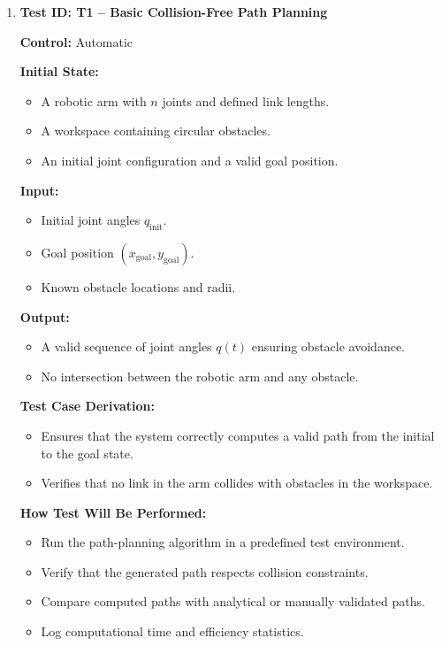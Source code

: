 \documentclass[12pt, titlepage]{article}
\begin{document}
\begin{enumerate}

\item \textbf{Test ID: T1 -- Basic Collision-Free Path Planning}  

\textbf{Control:} Automatic  

\textbf{Initial State:}  
\begin{itemize}
    \item A robotic arm with \( n \) joints and defined link lengths.
    \item A workspace containing circular obstacles.
    \item An initial joint configuration and a valid goal position.
\end{itemize}

\textbf{Input:}  
\begin{itemize}
    \item Initial joint angles \( q_{\text{init}} \).
    \item Goal position \( (x_{\text{goal}}, y_{\text{goal}}) \).
    \item Known obstacle locations and radii.
\end{itemize}

\textbf{Output:}  
\begin{itemize}
    \item A valid sequence of joint angles \( q(t) \) ensuring obstacle avoidance.
    \item No intersection between the robotic arm and any obstacle.
\end{itemize}

\textbf{Test Case Derivation:}  
\begin{itemize}
    \item Ensures that the system correctly computes a valid path from the initial to the goal state.
    \item Verifies that no link in the arm collides with obstacles in the workspace.
\end{itemize}

\textbf{How Test Will Be Performed:}  
\begin{itemize}
    \item Run the path-planning algorithm in a predefined test environment.
    \item Verify that the generated path respects collision constraints.
    \item Compare computed paths with analytical or manually validated paths.
    \item Log computational time and efficiency statistics.
\end{itemize}


\end{enumerate}
\end{document}
